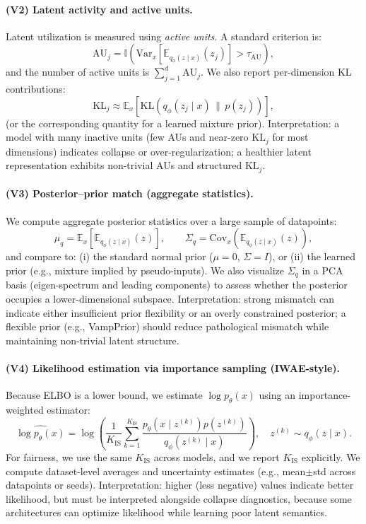 \paragraph{(V2) Latent activity and active units.}
Latent utilization is measured using \emph{active units}. A standard criterion is:
\[
\text{AU}_j = \mathbb{I}\left(\mathrm{Var}_{x}\!\left[\mathbb{E}_{q_\phi(z\mid x)}(z_j)\right] > \tau_{\mathrm{AU}}\right),
\]
and the number of active units is $\sum_{j=1}^{d} \text{AU}_j$. We also report per-dimension KL contributions:
\[
\mathrm{KL}_j \approx \mathbb{E}_{x}\left[\mathrm{KL}\left(q_\phi(z_j\mid x)\,\|\,p(z_j)\right)\right],
\]
(or the corresponding quantity for a learned mixture prior).
Interpretation: a model with many inactive units (few AUs and near-zero $\mathrm{KL}_j$ for most dimensions) indicates collapse or over-regularization; a healthier latent representation exhibits non-trivial AUs and structured $\mathrm{KL}_j$.

\paragraph{(V3) Posterior--prior match (aggregate statistics).}
We compute aggregate posterior statistics over a large sample of datapoints:
\[
\mu_q = \mathbb{E}_{x}\left[\mathbb{E}_{q_\phi(z\mid x)}(z)\right],\qquad
\Sigma_q = \mathrm{Cov}_{x}\left(\mathbb{E}_{q_\phi(z\mid x)}(z)\right),
\]
and compare to:
(i) the standard normal prior ($\mu=0$, $\Sigma=I$), or
(ii) the learned prior (e.g., mixture implied by pseudo-inputs).
We also visualize $\Sigma_q$ in a PCA basis (eigen-spectrum and leading components) to assess whether the posterior occupies a lower-dimensional subspace.
Interpretation: strong mismatch can indicate either insufficient prior flexibility or an overly constrained posterior; a flexible prior (e.g., VampPrior) should reduce pathological mismatch while maintaining non-trivial latent structure.

\paragraph{(V4) Likelihood estimation via importance sampling (IWAE-style).}
Because ELBO is a lower bound, we estimate $\log p_\theta(x)$ using an importance-weighted estimator:
\[
\widehat{\log p_\theta(x)}=
\log\left(\frac{1}{K_{\mathrm{IS}}}\sum_{k=1}^{K_{\mathrm{IS}}}
\frac{p_\theta(x\mid z^{(k)})p(z^{(k)})}{q_\phi(z^{(k)}\mid x)}\right),
\quad z^{(k)}\sim q_\phi(z\mid x).
\]
For fairness, we use the same $K_{\mathrm{IS}}$ across models, and we report $K_{\mathrm{IS}}$ explicitly. We compute dataset-level averages and uncertainty estimates (e.g., mean$\pm$std across datapoints or seeds).
Interpretation: higher (less negative) values indicate better likelihood, but must be interpreted alongside collapse diagnostics, because some architectures can optimize likelihood while learning poor latent semantics.

